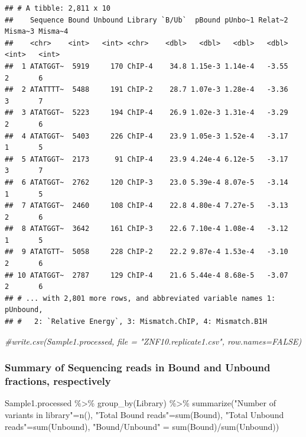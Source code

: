\documentclass[
]{article}
\newenvironment{Shaded}{\begin{snugshade}}{\end{snugshade}}
\newcommand{\CommentTok}[1]{\textcolor[rgb]{0.56,0.35,0.01}{\textit{#1}}}
\newcommand{\FunctionTok}[1]{\textcolor[rgb]{0.00,0.00,0.00}{#1}}
\newcommand{\NormalTok}[1]{#1}
\newcommand{\OtherTok}[1]{\textcolor[rgb]{0.56,0.35,0.01}{#1}}
\newcommand{\SpecialCharTok}[1]{\textcolor[rgb]{0.00,0.00,0.00}{#1}}
\newcommand{\StringTok}[1]{\textcolor[rgb]{0.31,0.60,0.02}{#1}}
\begin{document}
\begin{verbatim}
## # A tibble: 2,811 x 10
##    Sequence Bound Unbound Library `B/Ub`  pBound pUnbo~1 Relat~2 Misma~3 Misma~4
##    <chr>    <int>   <int> <chr>    <dbl>   <dbl>   <dbl>   <dbl>   <int>   <int>
##  1 ATATGGT~  5919     170 ChIP-4    34.8 1.15e-3 1.14e-4   -3.55       2       6
##  2 ATATTTT~  5488     191 ChIP-2    28.7 1.07e-3 1.28e-4   -3.36       3       7
##  3 ATATGGT~  5223     194 ChIP-4    26.9 1.02e-3 1.31e-4   -3.29       2       6
##  4 ATATGGT~  5403     226 ChIP-4    23.9 1.05e-3 1.52e-4   -3.17       1       5
##  5 ATATGGT~  2173      91 ChIP-4    23.9 4.24e-4 6.12e-5   -3.17       3       7
##  6 ATATGGT~  2762     120 ChIP-3    23.0 5.39e-4 8.07e-5   -3.14       1       5
##  7 ATATGGT~  2460     108 ChIP-4    22.8 4.80e-4 7.27e-5   -3.13       2       6
##  8 ATATGGT~  3642     161 ChIP-3    22.6 7.10e-4 1.08e-4   -3.12       1       5
##  9 ATATGTT~  5058     228 ChIP-2    22.2 9.87e-4 1.53e-4   -3.10       2       6
## 10 ATATGGT~  2787     129 ChIP-4    21.6 5.44e-4 8.68e-5   -3.07       2       6
## # ... with 2,801 more rows, and abbreviated variable names 1: pUnbound,
## #   2: `Relative Energy`, 3: Mismatch.ChIP, 4: Mismatch.B1H
\end{verbatim}

\begin{Shaded}
\begin{Highlighting}[]
\CommentTok{\#write.csv(Sample1.processed, file = "ZNF10.replicate1.csv", row.names=FALSE)}
\end{Highlighting}
\end{Shaded}

\hypertarget{summary-of-sequencing-reads-in-bound-and-unbound-fractions-respectively}{%
\subsubsection{Summary of Sequencing reads in Bound and Unbound
fractions,
respectively}\label{summary-of-sequencing-reads-in-bound-and-unbound-fractions-respectively}}

\begin{Shaded}
\begin{Highlighting}[]
\NormalTok{Sample1.processed }\SpecialCharTok{\%\textgreater{}\%}
  \FunctionTok{group\_by}\NormalTok{(Library) }\SpecialCharTok{\%\textgreater{}\%}
  \FunctionTok{summarize}\NormalTok{(}\StringTok{"Number of variants in library"}\OtherTok{=}\FunctionTok{n}\NormalTok{(),}
            \StringTok{"Total Bound reads"}\OtherTok{=}\FunctionTok{sum}\NormalTok{(Bound),}
            \StringTok{"Total Unbound reads"}\OtherTok{=}\FunctionTok{sum}\NormalTok{(Unbound),}
            \StringTok{"Bound/Unbound"} \OtherTok{=} \FunctionTok{sum}\NormalTok{(Bound)}\SpecialCharTok{/}\FunctionTok{sum}\NormalTok{(Unbound))}
\end{Highlighting}
\end{Shaded}
\end{document}
